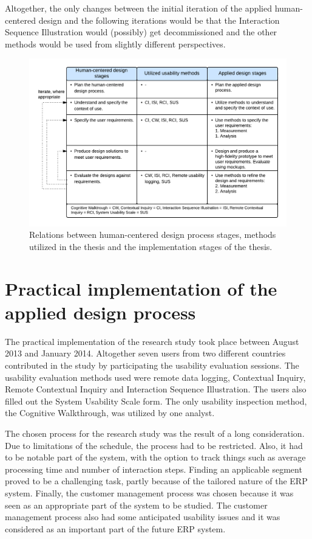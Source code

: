 \documentclass[12pt,a4paper,oneside,pdftex]{report}
\begin{document}
Altogether, the only changes between the initial iteration of the applied human-centered design and the following iterations would be that the Interaction Sequence Illustration would (possibly) get decommissioned and the other methods would be used from slightly different perspectives. 

\begin{figure}[H]
  	\centerline{
    	\includegraphics[width=1.3\textwidth]{./images/applied_hcd_process.png}
    	}
  	\caption{Relations between human-centered design process stages, methods utilized in the thesis and the implementation stages of the thesis.}
	\label{fig:hcd_process}
\end{figure}



\section{Practical implementation of the applied design process}
 \label{sec:implementation}

    
The practical implementation of the research study took place between August 2013 and January 2014. Altogether seven users from two different countries contributed in the study by participating the usability evaluation sessions. The usability evaluation methods used were remote data logging, Contextual Inquiry, Remote Contextual Inquiry and Interaction Sequence Illustration. The users also filled out the System Usability Scale form. The only usability inspection method, the Cognitive Walkthrough, was utilized by one analyst. 

The chosen process for the research study was the result of a long consideration. Due to limitations of the schedule, the process had to be restricted. Also, it had to be notable part of the system, with the option to track things such as average processing time and number of interaction steps. Finding an applicable segment proved to be a challenging task, partly because of the tailored nature of the ERP system. Finally, the customer management process was chosen because it was seen as an appropriate part of the system to be studied. The customer management process also had some anticipated usability issues and it was considered as an important part of the future ERP system.
\end{document}
